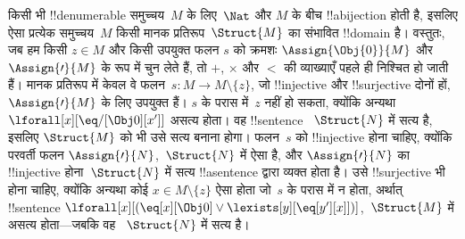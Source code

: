 \documentclass[../../../include/open-logic-section]{subfiles}
\begin{document}
\begin{explain}
किसी भी !!{denumerable} समुच्चय~$M$ के लिए~$\Nat$ और $M$ के बीच
!!a{bijection} होती है, इसलिए ऐसा प्रत्येक समुच्चय~$M$ किसी मानक
प्रतिरूप~$\Struct{M}$ का संभावित !!{domain} है। वस्तुतः, जब हम किसी
$z \in
M$ और किसी उपयुक्त फलन $s$ को क्रमशः
$\Assign{\Obj{0}}{M}$ और $\Assign{\prime}{M}$ के रूप में चुन लेते हैं,
तो $+$, $\times$ और $<$ की व्याख्याएँ पहले ही निश्चित हो जाती हैं। मानक
प्रतिरूप में केवल वे फलन~$s\colon M \to M \setminus \{z\}$, जो
!!{injective} और !!{surjective} दोनों हों,~$\Assign{\prime}{M}$ के लिए
उपयुक्त हैं। $s$ के परास में~$z$ नहीं हो सकता, क्योंकि अन्यथा
$\lforall[x][\eq/[\Obj 0][x']]$ असत्य होता। वह !!{sentence}
~$\Struct{N}$ में सत्य है, इसलिए $\Struct{M}$ को भी उसे सत्य बनाना होगा।
फलन~$s$ को !!{injective} होना चाहिए, क्योंकि परवर्ती फलन
$\Assign{\prime}{N}$,~$\Struct{N}$ में ऐसा है, और
$\Assign{\prime}{N}$ का !!{injective} होना~$\Struct{N}$ में सत्य
!!a{sentence} द्वारा व्यक्त होता है। उसे
!!{surjective} भी होना चाहिए, क्योंकि अन्यथा कोई
$x \in M \setminus \{z\}$ ऐसा होता जो~$s$ के परास में न होता, अर्थात्
!!{sentence} $\lforall[x][(\eq[x][\Obj 0] \lor
\lexists[y][\eq[y'][x]])]$,~$\Struct{M}$ में असत्य होता---जबकि वह
~$\Struct{N}$ में सत्य है।
\end{explain}
\end{document}
